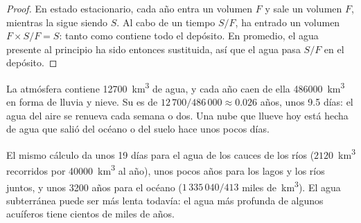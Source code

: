 \begin{proof}
En estado estacionario, cada año entra un volumen $F$ y sale un volumen $F$,
mientras la  sigue siendo $S$. Al cabo de un tiempo $S/F$, ha entrado un
volumen $F \times S/F = S$: tanto como contiene todo el depósito. En promedio,
el agua presente al principio ha sido entonces sustituida, así que el agua
pasa $S/F$ en el depósito.
\end{proof}

\begin{example}\label{ex:g10:freshwater-resources:atmosphere}
La atmósfera contiene \num{12700}~\unit{km^3} de agua, y cada año caen de ella
\num{486000}~\unit{km^3} en forma de lluvia y nieve. Su 
es de $12\,700/486\,000 \approx \num{0.026}$ años, unos \num{9.5} días: el
agua del aire se renueva cada semana o dos. Una nube que llueve hoy está hecha
de agua que salió del océano o del suelo hace unos pocos días.
\end{example}

El mismo cálculo da unos \num{19} días para el agua de los cauces de los ríos
($2120$~\unit{km^3} recorridos por \num{40000}~\unit{km^3} al año), unos
pocos años para los lagos y los ríos juntos, y unos \num{3200} años para el
océano ($1\,335\,040/413$ miles de~\unit{km^3}). El agua subterránea puede ser
más lenta todavía: el agua más profunda de algunos acuíferos tiene cientos de
miles de años.

